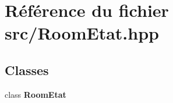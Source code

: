 \section{Référence du fichier src/\-Room\-Etat.hpp}
\label{_room_etat_8hpp}
\subsection*{Classes}
\begin{DoxyCompactItemize}
\item 
class {\bf Room\-Etat}
\end{DoxyCompactItemize}
